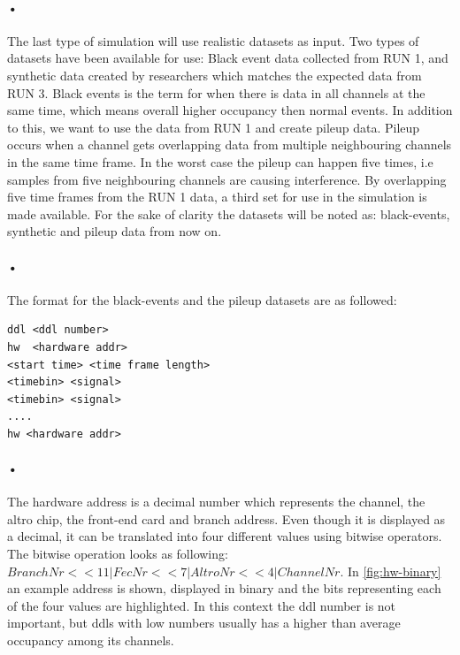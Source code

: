 \documentclass[a4paper, 12pt]{report}
\begin{document}
\paragraph{•}
The last type of simulation will use realistic datasets as input. 
Two types of datasets have been available for use: Black event data collected from RUN 1, and synthetic data created by researchers which matches the expected data from RUN 3.
Black events is the term for when there is data in all channels at the same time, which means overall higher occupancy then normal events.
In addition to this, we want to use the data from RUN 1 and create pileup data.
Pileup occurs when a channel gets overlapping data from multiple neighbouring channels in the same time frame.
In the worst case the pileup can happen five times, i.e samples from five neighbouring channels are causing interference.
By overlapping five time frames from the RUN 1 data, a third set for use in the simulation is made available.
For the sake of clarity the datasets will be noted as: black-events, synthetic and pileup data from now on.
 
\paragraph{•} 
The format for the black-events and the pileup datasets are as followed:
\begin{minipage}{\linewidth}
\begin{lstlisting}[caption=Format for the black-event and pileup dataset., label=lst:black-event-format]
ddl <ddl number>
hw  <hardware addr>
<start time> <time frame length>
<timebin> <signal>
<timebin> <signal>
....
hw <hardware addr>
\end{lstlisting}
\end{minipage}

\paragraph{•}
The hardware address is a decimal number which represents the channel, the \gls{altro} chip, the front-end card and branch address.
Even though it is displayed as a decimal, it can be translated into four different values using bitwise operators.
The bitwise operation looks as following: $BranchNr << 11 | FecNr << 7 | AltroNr << 4 | ChannelNr $.
In \ref{fig:hw-binary} an example address is shown, displayed in binary and the bits representing each of the four values are highlighted.
In this context the ddl number is not important, but ddls with low numbers usually has a higher than average occupancy among its channels.
\end{document}

